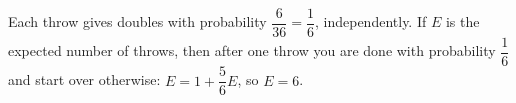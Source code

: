 Each throw gives doubles with probability $\dfrac6{36}=\dfrac16$, independently. If $E$ is the expected number of throws, then after one throw you are done with probability $\dfrac16$ and start over otherwise: $E=1+\dfrac56E$, so $E=\boxed{6}$.
